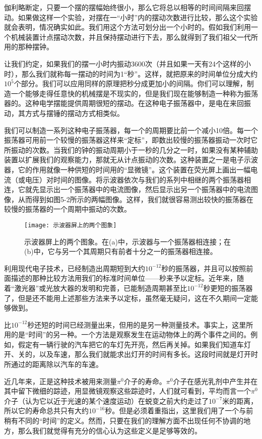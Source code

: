 \documentclass[11pt,oneside]{book}
\begin{document}
\begin{common-format}
伽利略断定，只要一个摆的摆幅始终很小，那么它将总以相等的时间间隔来回摆动。如果做这样一个实验，对摆在一“小时”内的摆动次数进行比较，那么这个实验就会表明，情况确实如此。我们用这个方法可划分出一个小时的。假如我们利用一个机械装置计点摆动次数，并且保持摆动进行下去，那么就得到了我们祖父一代所用的那种摆钟。

让我们约定，如果我们的摆一小时内振动3600次（并且如果一天有24个这样的小时），那么我们就称每一摆动的时间为1“秒”。这样，就把原来的时间单位分成大约$ 10^5 $个部分。我们可以应用同样的原理把秒分成更加小的间隔。你们可以理解，制造一个能够走得任意快的机械摆是不现实的，但是我们现在能够制造一种称为振荡器的。这种电学摆能提供周期很短的摆动。在这种电子振荡器中，是电在来回振动，其方式与摆锤的摆动方式相类似。

我们可以制造一系列这种电子振荡器，每一个的周期要比前一个减小10倍。每一个振荡器可用前一个较慢的振荡器这样来“定标”，即数出较慢的振荡器振动一次时它所振动的次数。当我们的钟的振动周期小于一秒的几分之一时，如果没有某种辅助装置以扩展我们的观察能力，那就无从计点振动的次数。这种装置之一是电子示波器，它的作用就像一种供短的时间用的“显微镜”。这个装置在荧光屏上画出一幅电流（或电压）对时间的图像。将示波器依次与我们的系列中相继的两个振荡器相连，它就先显示出一个振荡器中的电流图像，然后显示出另一个振荡器中的电流图像，从而得到如图5-2所示的两幅图像。这样，我们就很容易测出较快的振荡器在较慢的振荡器的一个周期中振动的次数。
\begin{figure}[H]
\centering
\texttt{[image: 示波器屏上的两个图象]}
\caption{\footnotesize 示波器屏上的两个图象。在(a)中，示波器与一个振荡器相连接；在(b)中，它与另一个其周期只有前者十分之一的振荡器相连接。}
\end{figure}


利用现代电子技术，已经制造出周期短到大约$ 10^{-12} $秒的振荡器，并且可以按照前面描述的那种比较方法用我们的标准时间单位——秒来予以定标。近年来，随着“激光器”或光放大器的发明和完善，已能制造周期甚至比$ 10^{-12} $秒更短的振荡器了，但是还不能用上述那些方法来予以定标，虽然毫无疑问，这在不久期间一定能够做到。

比$ 10^{-12} $秒还短的时间已经测量出来，但用的是另一种测量技术。事实上，这里所用的是“时间”的另一种。一个方法是观察发生在运动物体上的两个事件之间的。例如，假定有一辆行驶的汽车把它的车灯先开亮，然后再关掉。如果我们知道车灯开、关的，以及车速，那么我们就能求出灯开的时间有多长。这段时间就是灯开时所通过的距离除以汽车的车速。

近几年来，正是这种技术被用来测量$\pi^0$介子的寿命。$\pi^0$介子在感光乳剂中产生并在其中留下微细的踪迹，用显微镜观察这些踪迹时，人们就可看到，平均而言一个$\pi^0$介子（认为它以近于光速的某个速度运动）在蜕变之前大约走过了$ 10^{-7} $米的距离，所以它的寿命总共只有大约$ 10^{-16} $秒。但是必须着重指出，这里我们用了一个与前稍有不同的“时间”的定义。然而，只要在我们的理解方面不出现任何不协调的地方，那么我们就觉得有充分的信心认为这些定义是足够等效的。


\end{common-format}
\end{document}
